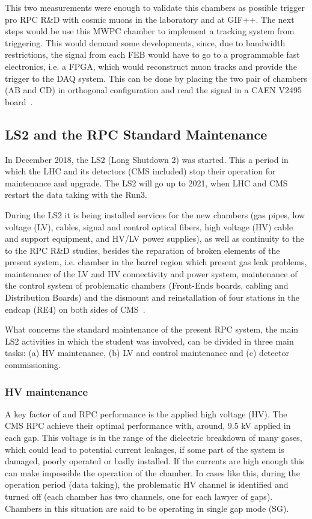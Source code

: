 This two measurements were enough to validate this chambers as possible trigger pro RPC R\&D with cosmic muons in the laboratory and at GIF++. The next steps would be use this MWPC chamber to implement a tracking system from triggering. This would demand some developments, since, due to bandwidth restrictions, the signal from each FEB would have to go to a programmable fast electronics, i.e. a FPGA, which would reconstruct muon tracks and provide the trigger to the DAQ system. This can be done by placing the two pair of chambers (AB and CD) in orthogonal configuration and read the signal in a CAEN V2495 board~\cite{caen_fpga}. 


\clearpage

\subsection{LS2 and the RPC Standard Maintenance}

In December 2018, the LS2 (Long Shutdown 2) was started. This a period in which the LHC and its detectors (CMS included) stop their operation for maintenance and upgrade. The LS2 will go up to 2021, when LHC and CMS restart the data taking with the Run3. 

During the LS2 it is being installed services for the new chambers (gas pipes, low voltage (LV), cables, signal and control optical fibers, high voltage (HV) cable and support equipment, and HV/LV power supplies), as well as continuity to the to the RPC R\&D studies, besides the reparation of broken elements of the present system, i.e. chamber in the barrel region which present gas leak problems, maintenance of the LV and HV connectivity and power system, maintenance of the control system of problematic chambers (Front-Ends boards, cabling and Distribution Boards) and the dismount and reinstallation of four stations in the endcap (RE4) on both sides of CMS~\cite{re4_dismount}.

What concerns the standard maintenance of the present RPC system, the main LS2 activities in which the student was involved, can be divided in three main tasks: (a) HV maintenance, (b) LV and control maintenance and (c) detector commissioning. 

\subsubsection{HV maintenance}

A key factor of and RPC performance is the applied high voltage (HV). The CMS RPC achieve their optimal performance with, around, 9.5 kV applied in each gap. This voltage is in the range of the dielectric breakdown of many gases, which could lead to potential current leakages, if some part of the system is damaged, poorly operated or badly installed. If the currents are high enough this can make impossible the operation of the chamber. In cases like this, during the operation period (data taking), the problematic HV channel is identified and turned off (each chamber has two channels, one for each lawyer of gaps). Chambers in this situation are said to be operating in single gap mode (SG).

